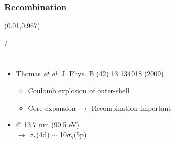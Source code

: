 \documentclass{beamer}
\makeatletter
\newcommand{\framenumber}{
\begin{textblock}{0}(0.01,0.967)
\begin{scriptsize}
{\color{gray}\insertframenumber/\inserttotalframenumber}
\end{scriptsize}
\end{textblock}
}
\makeatother
\begin{document}
\subsubsection{Recombination}
\begin{frame}{}\framenumber{}
   \begin{columns}
       \begin{itemize}
           \item Thomas \textit{et al.} J. Phys. B (42) 13 134018 (2009)
           \begin{itemize}
            \item Coulomb explosion of outer-shell
            \item Core expansion $\rightarrow$ Recombination important
           \end{itemize}
           \item<2-> @ 13.7 nm (90.5 eV) \\ $\rightarrow$ $\sigma_\gamma$(4d) $\sim$ 10$\sigma_\gamma$(5p)
       \end{itemize}



\end{columns}
\end{frame}
\end{document}
